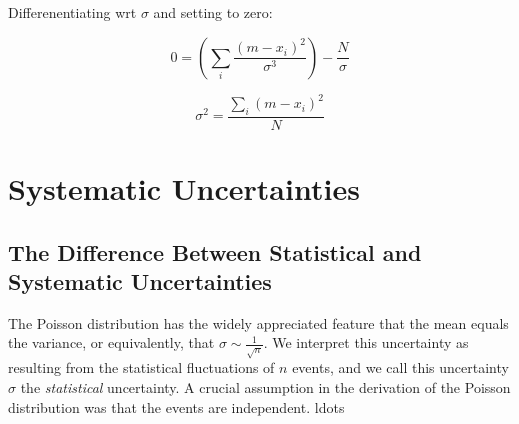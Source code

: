 \documentclass[12pt]{article}
\begin{document}
Differenentiating wrt $\sigma$ and setting to zero:

\begin{equation}
0 = \left( \sum_i \frac{(m-x_i)^2}{\sigma^3} \right)-\frac{N}{\sigma} 
\end{equation}

\begin{equation}
\sigma^2 = \frac{\sum_i (m-x_i)^2}{N} 
\end{equation}


\section{Systematic Uncertainties}

\subsection{The Difference Between Statistical and Systematic Uncertainties}

The Poisson distribution has the widely appreciated feature that the mean equals the variance, or equivalently, that $\sigma \sim \frac{1}{\sqrt{n}}$.  We interpret this uncertainty as resulting from the statistical fluctuations of $n$ events, and we call this uncertainty $\sigma$ the {\it statistical} uncertainty.  A crucial assumption in the derivation of the Poisson distribution was that the events are independent.
{ldots}
\end{document}
